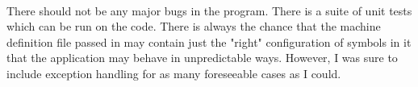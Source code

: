 \documentclass[12pt]{article}
\begin{document}
\paragraph{}
There should not be any major bugs in the program.  There is a suite of unit tests which can be 
run on the code.  There is always the chance that the machine definition file passed in may 
contain just the "right" configuration of symbols in it that the application may behave in 
unpredictable ways.  However, I was sure to include exception handling for as many foreseeable 
cases as I could.
\end{document}
